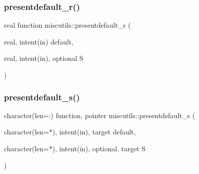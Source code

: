 \subsubsection{\texorpdfstring{presentdefault\+\_\+r()}{presentdefault\_r()}}
{\footnotesize\ttfamily real function miscutils\+::presentdefault\+\_\+r (\begin{DoxyParamCaption}\item[{real, intent(in)}]{default,  }\item[{real, intent(in), optional}]{S }\end{DoxyParamCaption})}

\mbox{\label{namespacemiscutils_aa4029af2cc791ce03e15abe363b19321}} 
\subsubsection{\texorpdfstring{presentdefault\+\_\+s()}{presentdefault\_s()}}
{\footnotesize\ttfamily character(len=\+:) function, pointer miscutils\+::presentdefault\+\_\+s (\begin{DoxyParamCaption}\item[{character(len=$\ast$), intent(in), target}]{default,  }\item[{character(len=$\ast$), intent(in), optional, target}]{S }\end{DoxyParamCaption})}

